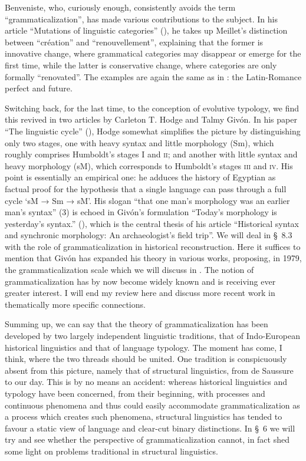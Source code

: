 Benveniste, who, curiously enough, consistently avoids the term ``grammaticalization'', has made various contributions to the subject. In his article “Mutations of linguistic categories” (\citeyear{Benveniste1968}), he takes up Meillet's distinction between “création” and “renouvellement”, explaining that the former is innovative change, where grammatical categories may disappear or emerge for the first time, while the latter is conservative change, where categories are only formally ``renovated''. The examples are again the same as in \citet{Meillet1912}: the Latin-Romance perfect and future.

Switching back, for the last time, to the conception of evolutive typology, we find this revived in two articles by Carleton T. Hodge and Talmy Givón. In his paper “The linguistic cycle” (\citeyear{Hodge1970}), Hodge somewhat simplifies the picture by distinguishing only two stages, one with heavy syntax and little morphology (Sm), which roughly comprises Humboldt's stages I and \textsc{ii}; and another with little syntax and heavy morphology (sM), which corresponds to Humboldt's stages \textsc{iii} and \textsc{iv}. His point is essentially an empirical one: he adduces the history of Egyptian as factual proof for the hypothesis that a single language can pass through a full cycle ‘sM → Sm → sM’. His slogan “that one man's morphology was an earlier man's syntax” (3) is echoed in Givón's formulation “Today's morphology is yesterday's syntax.” (\citeyear[413]{Givón1971}), which is the central thesis of his article “Historical syntax and synchronic morphology: An archaeologist's field trip”. We will deal in §~8.3 with the role of grammaticalization in historical reconstruction. Here it suffices to mention that Givón has expanded his theory in various works, proposing, in 1979, the grammaticalization scale which we will discuss in . The notion of grammaticalization has by now become widely known and is receiving ever greater interest. I will end my review here and discuss more recent work in thematically more specific connections.

Summing up, we can say that the theory of grammaticalization has been developed by two largely independent linguistic traditions, that of Indo-European historical linguistics and that of language typology. The moment has come, I think, where the two threads should be united. One tradition is conspicuously absent from this picture, namely that of structural linguistics, from de Saussure to our day. This is by no means an accident: whereas historical linguistics and typology have been concerned, from their beginning, with processes and continuous phenomena and thus could easily accommodate grammaticalization as a process which creates such phenomena, structural linguistics has tended to favour a static view of language and clear-cut binary distinctions. In §~6 we will try and see whether the perspective of grammaticalization cannot, in fact shed some light on problems traditional in structural linguistics.
